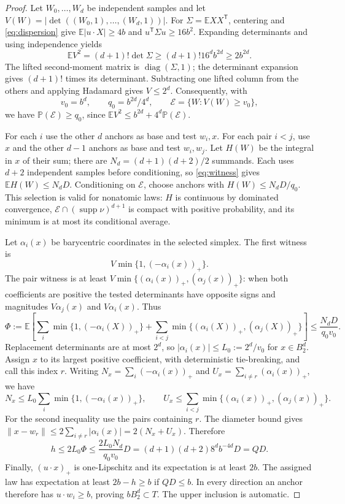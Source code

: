 \documentclass[11pt]{article}
\newcommand{\supp}{\operatorname{supp}}
\newcommand{\EE}{\mathbb E}
\newcommand{\pos}[1]{(#1)_+}
\newcommand{\BB}{B_2^d}
\begin{document}
\begin{proof}
Let $W_0,\ldots,W_d$ be independent samples and let
$V(W)=|\det((W_0,1),\ldots,(W_d,1))|$.
For $\Sigma=\EE XX^{\mathsf T}$, centering and
\eqref{eq:dispersion} give $\EE|u\cdot X|\ge4b$ and
$u^{\mathsf T}\Sigma u\ge16b^2$.
Expanding determinants and using independence yields
\[
 \EE V^2=(d+1)!\det\Sigma
       \ge(d+1)!16^d b^{2d}\ge2b^{2d}.
\]
The lifted second-moment matrix is $\operatorname{diag}(\Sigma,1)$;
the determinant expansion gives $(d+1)!$ times its determinant.
Subtracting one lifted column from the others and applying Hadamard gives
$V\le2^d$. Consequently, with
\[
 v_0=b^d,\qquad q_0=b^{2d}/4^d,\qquad
 \mathcal E=\{W:V(W)\ge v_0\},
\]
we have $\mathbb P(\mathcal E)\ge q_0$, since
$\EE V^2\le b^{2d}+4^d\mathbb P(\mathcal E)$.

For each $i$ use the other $d$ anchors as base and test $w_i,x$.
For each pair $i<j$, use $x$ and the other $d-1$ anchors as base and
test $w_i,w_j$.
Let $H(W)$ be the integral in $x$ of their sum; there are
$N_d=(d+1)(d+2)/2$ summands.
Each uses $d+2$ independent samples before conditioning, so
\eqref{eq:witness} gives $\EE H(W)\le N_dD$.
Conditioning on $\mathcal E$, choose anchors with
$H(W)\le N_dD/q_0$.
This selection is valid for nonatomic laws: $H$ is continuous by dominated
convergence, $\mathcal E\cap(\supp\nu)^{d+1}$ is compact with positive
probability, and its minimum is at most its conditional average.

Let $\alpha_i(x)$ be barycentric coordinates in the selected simplex.
The first witness is
\[
 V\min\{1,\pos{-\alpha_i(x)}\}.
\]
The pair witness is at least
$V\min\{\pos{\alpha_i(x)},\pos{\alpha_j(x)}\}$:
when both coefficients are positive the tested determinants have opposite
signs and magnitudes $V\alpha_j(x)$ and $V\alpha_i(x)$.
Thus
\[
 \Phi:=\EE\left[
    \sum_i\min\{1,\pos{-\alpha_i(X)}\}
    +\sum_{i<j}\min\{\pos{\alpha_i(X)},\pos{\alpha_j(X)}\}\right]
 \le\frac{N_dD}{q_0v_0}.
\]
Replacement determinants are at most $2^d$, so
$|\alpha_i(x)|\le L_0:=2^d/v_0$ for $x\in\BB$.
Assign $x$ to its largest positive coefficient, with deterministic
tie-breaking, and call this index $r$.
Writing $N_x=\sum_i\pos{-\alpha_i(x)}$ and
$U_x=\sum_{i\ne r}\pos{\alpha_i(x)}$, we have
\[
 N_x\le L_0\sum_i\min\{1,\pos{-\alpha_i(x)}\},
 \qquad
 U_x\le\sum_{i<j}\min\{\pos{\alpha_i(x)},\pos{\alpha_j(x)}\}.
\]
For the second inequality use the pairs containing $r$.
The diameter bound gives
$\|x-w_r\|\le2\sum_{i\ne r}|\alpha_i(x)|=2(N_x+U_x)$.
Therefore
\[
 h\le2L_0\Phi
 \le\frac{2L_0N_d}{q_0v_0}D
 =(d+1)(d+2)8^d b^{-4d}D=QD.
\]
Finally, $\pos{u\cdot x}$ is one-Lipschitz and its expectation is at
least $2b$. The assigned law has expectation at least $2b-h\ge b$
if $QD\le b$. In every direction an anchor therefore has
$u\cdot w_i\ge b$, proving $b\BB\subset T$.
The upper inclusion is automatic.
\end{proof}
\end{document}
